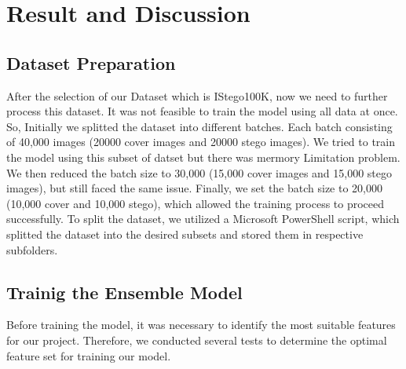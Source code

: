 \chapter{Result and Discussion}
\setcounter{secnumdepth}{4}
\section{Dataset Preparation}
After the selection of our Dataset which is IStego100K\cite{7}, now we need to further process this dataset. It was not feasible to train the model using all data at once. So, Initially we splitted the dataset into different batches. Each batch consisting of 40,000 images (20000 cover images and 20000 stego images). We tried to train the model using this subset of datset but there was mermory Limitation problem. We then reduced the batch size to 30,000 (15,000 cover images and 15,000 stego images), but still faced the same issue. Finally, we set the batch size to 20,000 (10,000 cover and 10,000 stego), which allowed the training process to proceed successfully. To split the dataset, we utilized a Microsoft PowerShell script, which splitted the dataset into the desired subsets and stored them in respective subfolders.\\
\section{Trainig the Ensemble Model}
Before training the model, it was necessary to identify the most suitable features for our project. Therefore, we conducted several tests to determine the optimal feature set for training our model.
